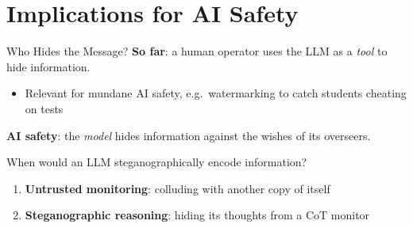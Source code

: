 
\section{Implications for AI Safety}

\begin{frame}{Who Hides the Message?}
\textbf{So far}: a human operator uses the LLM as a \emph{tool} to hide information.
\begin{itemize}
\item Relevant for mundane AI safety, e.g.\ watermarking to catch students cheating on tests
\end{itemize}
\vspace{0.5em}
\textbf{AI safety}: the \emph{model} hides information against the wishes of its overseers.
\vspace{0.5em}
\begin{center}
\Large When would an LLM steganographically encode information?
\end{center}
\vspace{0.5em}
\begin{enumerate}
\item \textbf{Untrusted monitoring}: colluding with another copy of itself
\item \textbf{Steganographic reasoning}: hiding its thoughts from a CoT monitor
\end{enumerate}

\end{frame}

